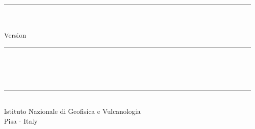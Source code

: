 
\thispagestyle{empty}

\vspace*{0.3in}

\begin{centering}
  \rule{6in}{0.04in}				\\	\vspace{0.25in}
  {\Huge \PDAC\ \RMTITLE}			\\	\vspace{0.25in}
  {\Large Version \PDACVERSION}			\\	\vspace{0.20in}
  \rule{6in}{0.04in}				\\	\vspace{0.25in}
  {\Large \PDACAUTHORS}				\\	\vspace{0.20in}
  \PDACDATE					\\	\vspace{0.20in}
  \rule{6in}{0.04in}				\\	\vspace{0.25in}
  {\large       Istituto Nazionale di Geofisica e Vulcanologia} \\ 
  {\large       Pisa - Italy}      \\ 
\end{centering}
\vspace{0.2in}

\noindent \RMDESC

